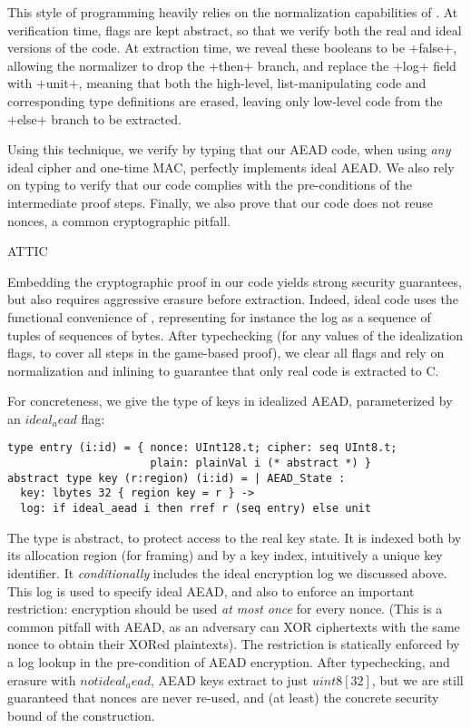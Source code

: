 This style of programming heavily relies on the normalization capabilities of
\fstar. 
%
At verification time, flags are kept abstract, so that we verify both the real and ideal versions of the code.
%
At extraction time, we reveal these booleans to be \li+false+, allowing the
\fstar normalizer to drop the \li+then+ branch, and replace the
\li+log+ field with \li+unit+, meaning that both the high-level,
list-manipulating code and corresponding type definitions are erased, leaving
only low-level code from the \li+else+ branch to be extracted.

Using this technique, we verify by typing that our AEAD code,
when using \emph{any} ideal cipher and one-time MAC, perfectly
implements ideal AEAD.
%
We also rely on typing to verify that our code complies with the
pre-conditions of the intermediate proof steps. Finally, we also prove
that our code does not reuse nonces, a common cryptographic pitfall.

\iffalse

ATTIC 

Embedding the cryptographic proof in our code yields strong security
guarantees, but also requires aggressive erasure before extraction.
Indeed, ideal code uses the functional convenience of \fstar,
representing for instance the log as a sequence of tuples of sequences
of bytes.
%
After typechecking (for any values of the idealization flags, to cover
all steps in the game-based proof), we clear all flags and rely on
\fstar normalization and inlining to guarantee that only real code is
extracted to C.

For concreteness, we give the type of keys in idealized AEAD,
parameterized by an \lst$ideal_aead$ flag:
\begin{lstlisting}
type entry (i:id) = { nonce: UInt128.t; cipher: seq UInt8.t; 
                      plain: plainVal i (* abstract *) }
abstract type key (r:region) (i:id) = | AEAD_State :
  key: lbytes 32 { region key = r } -> 
  log: if ideal_aead i then rref r (seq entry) else unit 
\end{lstlisting}
The type is abstract, to protect access to the real key state.  
It is indexed both by its allocation region (for framing) and
by a key index, intuitively a unique key identifier.
%
It \emph{conditionally} includes the ideal encryption log we discussed
above.
%
This log is used to specify ideal AEAD, and also to enforce an
important restriction: encryption should be used \emph{at most once}
for every nonce.
%
(This is a common pitfall with AEAD, as an adversary can XOR
ciphertexts with the same nonce to obtain their XORed plaintexts).
%
The restriction is statically enforced by a log lookup in the
pre-condition of AEAD encryption.
%
After typechecking, and erasure with \lst$not ideal_aead$, AEAD keys
extract to just \lst$uint8[32]$, but we are still guaranteed that
nonces are never re-used, and (at least) the concrete security bound
of the construction.

